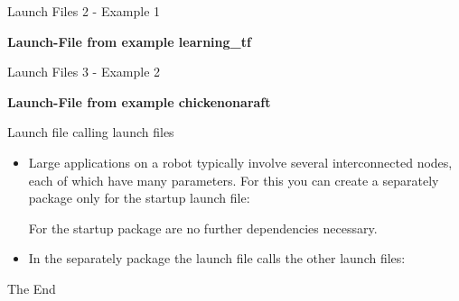 \documentclass{beamer}
\begin{document}
\begin{frame}{Launch Files 2 - Example 1}
\begin{large}
	\textbf{Launch-File from example learning\_tf} 
\end{large}

\end{frame}
\begin{frame}{Launch Files 3 - Example 2}
	\begin{large}
		\textbf{Launch-File from example chickenonaraft} 
	\end{large}
	\vspace{10px}

\end{frame}
\begin{frame}{Launch file calling launch files}
\begin{itemize}
\item Large applications on a robot typically involve several interconnected nodes, each of which have many parameters. For this you can create a separately package only for the startup launch file:
\vspace{10px}

\vspace{10px}
For the startup package are no further dependencies necessary. 
\end{itemize}
\begin{itemize}
 \item In the separately package the launch file calls the other launch files:
 
\end{itemize}
\end{frame}
\begin{frame}
\Huge{\centerline{The End}}
\end{frame}
\end{document}
